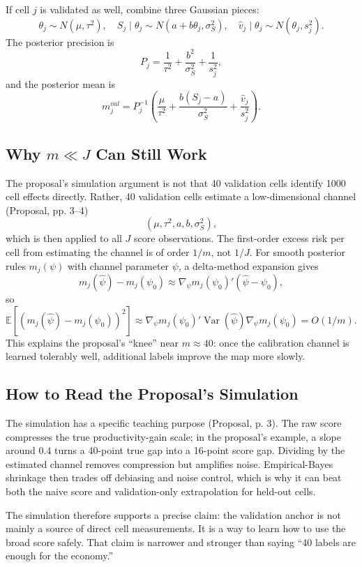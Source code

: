 \documentclass[11pt]{article}
\newcommand{\E}{\mathbb{E}}
\newcommand{\Var}{\operatorname{Var}}
\begin{document}
If cell $j$ is validated as well, combine three Gaussian pieces:
\[
  \theta_j\sim N(\mu,\tau^2),\quad
  S_j\mid\theta_j\sim N(a+b\theta_j,\sigma_S^2),\quad
  \widehat v_j\mid\theta_j\sim N(\theta_j,s_j^2).
\]
The posterior precision is
\[
  P_j=\frac{1}{\tau^2}+\frac{b^2}{\sigma_S^2}+\frac{1}{s_j^2},
\]
and the posterior mean is
\[
  m_j^{val}=P_j^{-1}
  \left(
    \frac{\mu}{\tau^2}
    +\frac{b(S_j-a)}{\sigma_S^2}
    +\frac{\widehat v_j}{s_j^2}
  \right).
\]

\subsection{Why $m\ll J$ Can Still Work}

The proposal's simulation argument is not that 40 validation cells identify 1000 cell effects directly. Rather, 40 validation cells estimate a low-dimensional channel (Proposal, pp. 3--4)
\[
  (\mu,\tau^2,a,b,\sigma_S^2),
\]
which is then applied to all $J$ score observations. The first-order excess risk per cell from estimating the channel is of order $1/m$, not $1/J$. For smooth posterior rules $m_j(\psi)$ with channel parameter $\psi$, a delta-method expansion gives
\[
  m_j(\widehat\psi)-m_j(\psi_0)
  \approx
  \nabla_\psi m_j(\psi_0)'(\widehat\psi-\psi_0),
\]
so
\[
  \E\left[(m_j(\widehat\psi)-m_j(\psi_0))^2\right]
  \approx
  \nabla_\psi m_j(\psi_0)'
  \Var(\widehat\psi)
  \nabla_\psi m_j(\psi_0)
  =
  O(1/m).
\]
This explains the proposal's ``knee'' near $m\approx 40$: once the calibration channel is learned tolerably well, additional labels improve the map more slowly.

\subsection{How to Read the Proposal's Simulation}

The simulation has a specific teaching purpose (Proposal, p. 3). The raw score compresses the true productivity-gain scale; in the proposal's example, a slope around $0.4$ turns a 40-point true gap into a 16-point score gap. Dividing by the estimated channel removes compression but amplifies noise. Empirical-Bayes shrinkage then trades off debiasing and noise control, which is why it can beat both the naive score and validation-only extrapolation for held-out cells.

The simulation therefore supports a precise claim: the validation anchor is not mainly a source of direct cell measurements. It is a way to learn how to use the broad score safely. That claim is narrower and stronger than saying ``40 labels are enough for the economy.''
\end{document}
